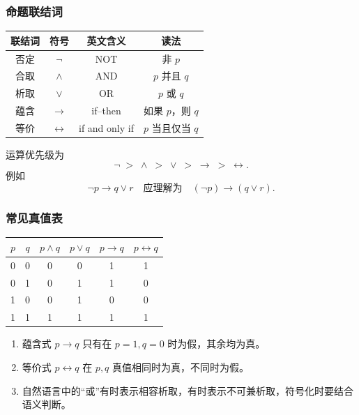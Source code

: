 \subsubsection{命题联结词}

\begin{center}
	\begin{tabular}{cccc}
		\toprule
		联结词 & 符号 & 英文含义 & 读法\\
		\midrule
		否定 & \(\neg\) & NOT & 非 \(p\)\\
		合取 & \(\land\) & AND & \(p\) 并且 \(q\)\\
		析取 & \(\lor\) & OR & \(p\) 或 \(q\)\\
		蕴含 & \(\to\) & if--then & 如果 \(p\)，则 \(q\)\\
		等价 & \(\leftrightarrow\) & if and only if & \(p\) 当且仅当 \(q\)\\
		\bottomrule
	\end{tabular}
\end{center}

运算优先级为
\[
\neg\;>\;\land\;>\;\lor\;>\;\to\;>\;\leftrightarrow.
\]
例如
\[
\neg p\to q\lor r\quad \text{应理解为}\quad (\neg p)\to(q\lor r).
\]

\subsubsection{常见真值表}

\begin{center}
	\begin{tabular}{cccccc}
		\toprule
		\(p\) & \(q\) & \(p\land q\) & \(p\lor q\) & \(p\to q\) & \(p\leftrightarrow q\)\\
		\midrule
		0&0&0&0&1&1\\
		0&1&0&1&1&0\\
		1&0&0&1&0&0\\
		1&1&1&1&1&1\\
		\bottomrule
	\end{tabular}
\end{center}

\begin{enumerate}
	\item 蕴含式 \(p\to q\) 只有在 \(p=1,q=0\) 时为假，其余均为真。
	\item 等价式 \(p\leftrightarrow q\) 在 \(p,q\) 真值相同时为真，不同时为假。
	\item 自然语言中的“或”有时表示相容析取，有时表示不可兼析取，符号化时要结合语义判断。
\end{enumerate}

